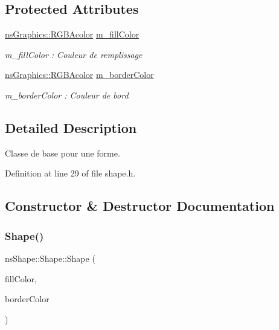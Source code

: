 \subsection*{Protected Attributes}
\begin{DoxyCompactItemize}
\item 
\hyperlink{classns_graphics_1_1_r_g_b_acolor}{ns\+Graphics\+::\+R\+G\+B\+Acolor} \hyperlink{classns_shape_1_1_shape_a68841e117adddc95734dcbaa62f68832}{m\+\_\+fill\+Color}
\begin{DoxyCompactList}\small\item\em m\+\_\+fill\+Color \+: Couleur de remplissage \end{DoxyCompactList}\item 
\hyperlink{classns_graphics_1_1_r_g_b_acolor}{ns\+Graphics\+::\+R\+G\+B\+Acolor} \hyperlink{classns_shape_1_1_shape_a0444014e3ee0fa1e6ba5295e530a4f82}{m\+\_\+border\+Color}
\begin{DoxyCompactList}\small\item\em m\+\_\+border\+Color \+: Couleur de bord \end{DoxyCompactList}\end{DoxyCompactItemize}


\subsection{Detailed Description}
Classe de base pour une forme. 

Definition at line 29 of file shape.\+h.



\subsection{Constructor \& Destructor Documentation}
\mbox{\label{classns_shape_1_1_shape_a879f450649c23c83dee576234703951d}} 
\subsubsection{\texorpdfstring{Shape()}{Shape()}}
{\footnotesize\ttfamily ns\+Shape\+::\+Shape\+::\+Shape (\begin{DoxyParamCaption}\item[{const \hyperlink{classns_graphics_1_1_r_g_b_acolor}{ns\+Graphics\+::\+R\+G\+B\+Acolor} \&}]{fill\+Color,  }\item[{const \hyperlink{classns_graphics_1_1_r_g_b_acolor}{ns\+Graphics\+::\+R\+G\+B\+Acolor} \&}]{border\+Color }\end{DoxyParamCaption})}



